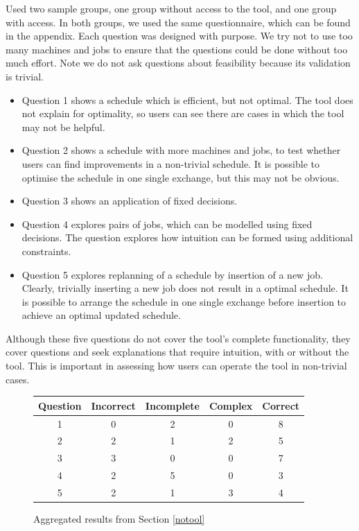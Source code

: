 Used two sample groups, one group without access to the tool, and one group with access. In both groups, we used the same questionnaire, which can be found in the appendix. Each question was designed with purpose. We try not to use too many machines and jobs to ensure that the questions could be done without too much effort. Note we do not ask questions about feasibility because its validation is trivial. 

\begin{itemize}
	\item Question 1 shows a schedule which is efficient, but not optimal. The tool does not explain for optimality, so users can see there are cases in which the tool may not be helpful.
	\item Question 2 shows a schedule with more machines and jobs, to test whether users can find improvements in a non-trivial schedule. It is possible to optimise the schedule in one single exchange, but this may not be obvious.
	\item Question 3 shows an application of fixed decisions.
	\item Question 4 explores pairs of jobs, which can be modelled using fixed decisions. The question explores how intuition can be formed using additional constraints.
	\item Question 5 explores replanning of a schedule by insertion of a new job. Clearly, trivially inserting a new job does not result in a optimal schedule. It is possible to arrange the schedule in one single exchange before insertion to achieve an optimal updated schedule.
\end{itemize}

Although these five questions do not cover the tool's complete functionality, they cover questions and seek explanations that require intuition, with or without the tool. This is important in assessing how users can operate the tool in non-trivial cases. 

\begin{figure}[H]
	\label{notooltable}
	\begin{center}
		\begin{tabular}{c | c c c c}
			Question & Incorrect & Incomplete & Complex & Correct \\
			\hline
			1 & 0 & 2 & 0 & 8 \\
			2 & 2 & 1 & 2 & 5 \\
			3 & 3 & 0 & 0 & 7 \\
			4 & 2 & 5 & 0 & 3 \\
			5 & 2 & 1 & 3 & 4 \\	
		\end{tabular}
	\end{center}
	\caption{Aggregated results from Section \ref{notool}}
\end{figure}

